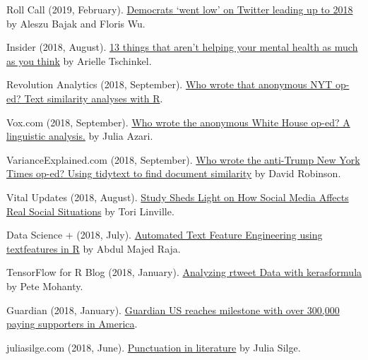 \begin{bibenum}
    \item[] Roll Call (2019, February).
      \href{https://www.rollcall.com/news/lead-midterms-twitter-republicans-went-high-democrats-went-low}{Democrats ‘went low’ on Twitter leading up to 2018} by Aleszu Bajak and Floris Wu.
    \item[] Insider (2018, August).
      \href{https://www.thisisinsider.com/things-that-are-not-helping-your-mental-health-2018-9}{13 things that aren't helping your mental health as much as you think} by Arielle Tschinkel.
    \item[] Revolution Analytics (2018, September).
      \href{http://blog.revolutionanalytics.com/2018/09/anonymous-nyt-op-ed.html}{Who wrote that anonymous NYT op-ed? Text similarity analyses with R}.
    \item[] Vox.com (2018, September).
      \href{https://www.vox.com/mischiefs-of-faction/2018/9/7/17830304/who-wrote-anonymous-white-house-op-ed}{Who wrote the anonymous White House op-ed? A linguistic analysis.} by Julia Azari.
    \item[] VarianceExplained.com (2018, September).
      \href{http://varianceexplained.org/r/op-ed-text-analysis/}{Who wrote the anti-Trump New York Times op-ed? Using tidytext to find document similarity} by David Robinson.
    \item[] Vital Updates (2018, August).
      \href{https://vitalupdates.com/study-sheds-light-on-how-social-media-affects-real-social-situations/}{Study Sheds Light on How Social Media Affects Real Social Situations} by Tori Linville.
    \item[] Data Science {+} (2018, July).
      \href{https://datascienceplus.com/automated-text-feature-engineering-using-textfeatures-in-r/}{Automated Text Feature Engineering using textfeatures in R} by Abdul Majed Raja.
    \item[] TensorFlow for R Blog (2018, January).
      \href{https://blogs.rstudio.com/tensorflow/posts/2018-01-24-analyzing-rtweet-data-with-kerasformula/}{Analyzing rtweet Data with kerasformula} by Pete Mohanty.
    \item[] Guardian (2018, January).
      \href{https://www.theguardian.com/gnm-press-office/2018/jan/26/guardian-us-reaches-milestone-with-over-300000-paying-supporters-in-america}{Guardian US reaches milestone with over 300,000 paying supporters in America}.
    \item[] juliasilge.com (2018, June).
      \href{https://juliasilge.com/blog/punctution-literature/}{Punctuation in literature} by Julia Silge.

\end{bibenum}
